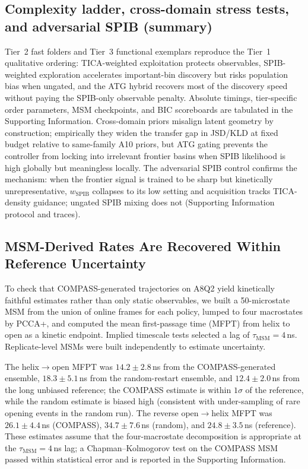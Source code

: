 \documentclass[journal=jctcce,manuscript=article,layout=twocolumn]{achemso}
\begin{document}
\subsection{Complexity ladder, cross-domain stress tests, and adversarial SPIB (summary)}
\label{sec:results_ladder_summary}

Tier~2 fast folders and Tier~3 functional exemplars reproduce the Tier~1 qualitative ordering: TICA-weighted exploitation protects observables, SPIB-weighted exploration accelerates important-bin discovery but risks population bias when ungated, and the ATG hybrid recovers most of the discovery speed without paying the SPIB-only observable penalty. Absolute timings, tier-specific order parameters, MSM checkpoints, and BIC scoreboards are tabulated in the Supporting Information. Cross-domain priors misalign latent geometry by construction; empirically they widen the transfer gap in JSD/KLD at fixed budget relative to same-family A10 priors, but ATG gating prevents the controller from locking into irrelevant frontier basins when SPIB likelihood is high globally but meaningless locally. The adversarial SPIB control confirms the mechanism: when the frontier signal is trained to be sharp but kinetically unrepresentative, $w_{\mathrm{SPIB}}$ collapses to its low setting and acquisition tracks TICA-density guidance; ungated SPIB mixing does not (Supporting Information protocol and traces).

\subsection{MSM-Derived Rates Are Recovered Within Reference Uncertainty}
\label{sec:results_msm}

To check that COMPASS-generated trajectories on A8Q2 yield kinetically faithful estimates rather than only static observables, we built a 50-microstate MSM\cite{prinz2011markov,husic2018markov} from the union of online frames for each policy, lumped to four macrostates by PCCA+,\cite{deuflhard2005robust} and computed the mean first-passage time (MFPT) from helix to open as a kinetic endpoint. Implied timescale tests selected a lag of $\tau_{\mathrm{MSM}}=4$\,ns. Replicate-level MSMs were built independently to estimate uncertainty.

The helix$\to$open MFPT was $14.2\pm 2.8$\,ns from the COMPASS-generated ensemble, $18.3\pm 5.1$\,ns from the random-restart ensemble, and $12.4\pm 2.0$\,ns from the long unbiased reference; the COMPASS estimate is within $1\sigma$ of the reference, while the random estimate is biased high (consistent with under-sampling of rare opening events in the random run). The reverse open$\to$helix MFPT was $26.1\pm 4.4$\,ns (COMPASS), $34.7\pm 7.6$\,ns (random), and $24.8\pm 3.5$\,ns (reference). These estimates assume that the four-macrostate decomposition is appropriate at the $\tau_{\mathrm{MSM}}=4$\,ns lag; a Chapman--Kolmogorov test on the COMPASS MSM passed within statistical error and is reported in the Supporting Information.
\end{document}
